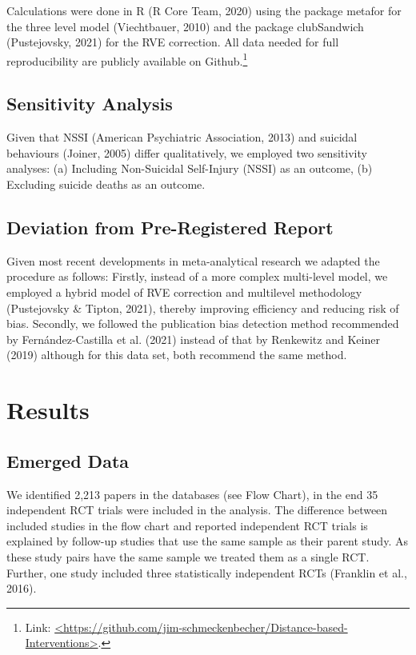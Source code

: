 \documentclass[
  english,
  man]{apa6}
\begin{document}
Calculations were done in R (R Core Team, 2020) using the package metafor for the three level model (Viechtbauer, 2010) and the package clubSandwich (Pustejovsky, 2021) for the RVE correction. All data needed for full reproducibility are publicly available on Github.\footnote{Link: \href{https://github.com/jim-schmeckenbecher/Distance-based-Interventions}{\textless https://github.com/jim-schmeckenbecher/Distance-based-Interventions\textgreater{}}.}

\hypertarget{sensitivity-analysis}{%
\subsection{Sensitivity Analysis}\label{sensitivity-analysis}}

Given that NSSI (American Psychiatric Association, 2013) and suicidal behaviours (Joiner, 2005) differ qualitatively, we employed two sensitivity analyses: (a) Including Non-Suicidal Self-Injury (NSSI) as an outcome, (b) Excluding suicide deaths as an outcome.

\hypertarget{deviation-from-pre-registered-report}{%
\subsection{Deviation from Pre-Registered Report}\label{deviation-from-pre-registered-report}}

Given most recent developments in meta-analytical research we adapted the procedure as follows: Firstly, instead of a more complex multi-level model, we employed a hybrid model of RVE correction and multilevel methodology (Pustejovsky \& Tipton, 2021), thereby improving efficiency and reducing risk of bias. Secondly, we followed the publication bias detection method recommended by Fernández-Castilla et al. (2021) instead of that by Renkewitz and Keiner (2019) although for this data set, both recommend the same method.

\hypertarget{results}{%
\section{Results}\label{results}}

\hypertarget{emerged-data}{%
\subsection{Emerged Data}\label{emerged-data}}

We identified 2,213 papers in the databases (see Flow Chart), in the end 35 independent RCT trials were included in the analysis. The difference between included studies in the flow chart and reported independent RCT trials is explained by follow-up studies that use the same sample as their parent study. As these study pairs have the same sample we treated them as a single RCT. Further, one study included three statistically independent RCTs (Franklin et al., 2016).
\end{document}
